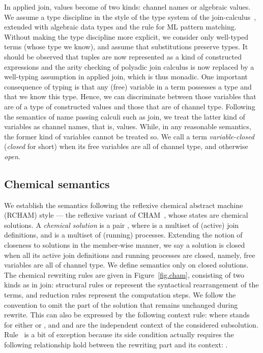 \documentclass{LMCS}
\newcommand{\rln}[1]{\text{\small\sc #1}}
\newcommand{\rcham}{\textrm{RCHAM}\xspace}
\newcommand{\cham}{\textrm{CHAM}\xspace}
\renewcommand{\_}{\mathord{\rule[-.25ex]{1ex}{.15ex}}}
\begin{document}
In applied join, values become of two kinds: channel names or
algebraic values.  We assume a type discipline in the style of the
type system of the
join-calculus~\cite{Fournet-Laneve-Maranget-Remy:typing-join},
extended with algebraic data types and the rule for ML pattern
matching.  Without making the type discipline more explicit, we
consider only well-typed terms (whose type we know), and assume that
substitutions preserve types. It should be observed that tuples are
now represented as a kind of constructed expressions and the arity
checking of polyadic join calculus is now replaced by a well-typing
assumption in applied join, which is thus monadic. One important
consequence of typing is that any (free) variable in a term possesses
a type and that we know this type.  Hence, we can discriminate between
those variables that are of a type of constructed values and those
that are of channel type.  Following the semantics of name passing
calculi such as join, we treat the latter kind of variables as channel
names, that is, values.  While, in any reasonable semantics, the
former kind of variables cannot be treated so.  We call a term
\emph{variable-closed} (\emph{closed} for short) when its free
variables are all of channel type, and otherwise \emph{open}.

\subsection{Chemical semantics}
\label{subsec.cham}

We establish the semantics following the reflexive chemical abstract
machine (\rcham) style --- the reflexive variant of
\cham~\cite{CHAM92}, whose states are chemical solutions. A
\emph{chemical solution} is a pair ,
where  is a multiset of (active) join definitions, and
 is a multiset of (running) processes.  Extending the
notion of closeness to solutions in the member-wise manner, we say a
solution is closed when all its active join definitions and running
processes are closed, namely, free variables are all of channel type.
We define semantics only on closed solutions. The chemical rewriting
rules are given in Figure~\ref{fig.cham},
consisting of two kinds as
in join: structural rules  or  represent the syntactical
rearrangement of the terms, and reduction rules  represent
the computation steps. We follow the convention to omit the part of
the solution that remains unchanged during rewrite.
This can also be expressed by the following context rule: 
where
 stands for either  or , and
 and  are the independent context of the considered
subsolution. Rule~\rln{Str-Def} is a bit of exception because its side
condition actually requires the following relationship hold between
the rewriting part and its context: .
\end{document}
